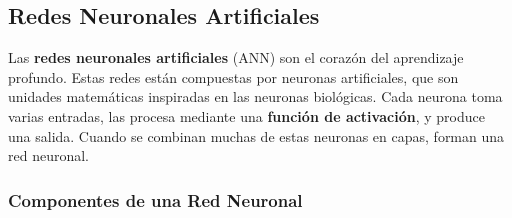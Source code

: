 \subsection{Redes Neuronales Artificiales}\label{subsec:redes_neuronales_artificiales}
Las \textbf{redes neuronales artificiales} (ANN) son el corazón del aprendizaje profundo.
Estas redes están compuestas por neuronas artificiales, que son unidades matemáticas inspiradas en las neuronas
biológicas.
Cada neurona toma varias entradas, las procesa mediante una \textbf{función de activación}, y produce una salida.
Cuando se combinan muchas de estas neuronas en capas, forman una red neuronal.

\subsubsection{Componentes de una Red Neuronal}\label{subsubsec:componentes_de_una_red_neuronal}

